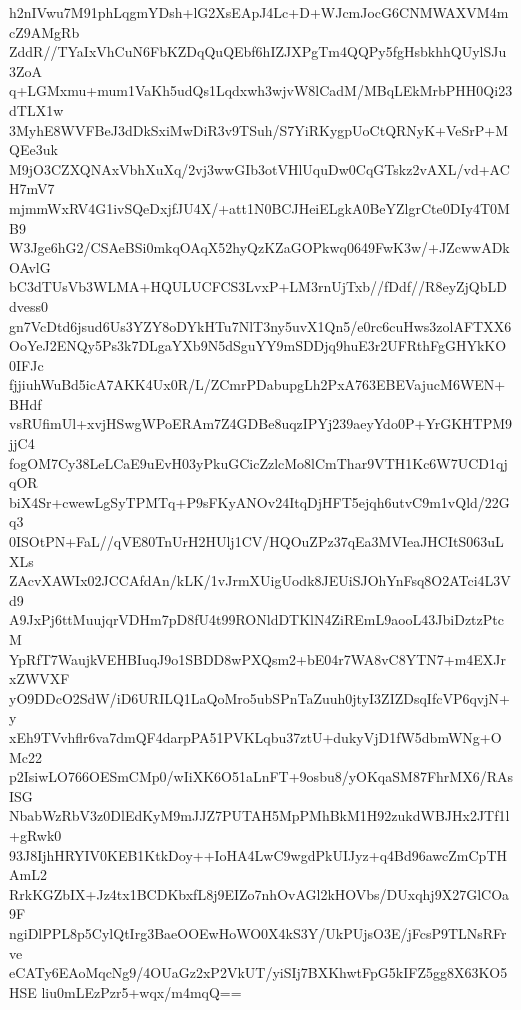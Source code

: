 h2nIVwu7M91phLqgmYDsh+lG2XsEApJ4Lc+D+WJcmJocG6CNMWAXVM4mcZ9AMgRb
ZddR//TYaIxVhCuN6FbKZDqQuQEbf6hIZJXPgTm4QQPy5fgHsbkhhQUylSJu3ZoA
q+LGMxmu+mum1VaKh5udQs1Lqdxwh3wjvW8lCadM/MBqLEkMrbPHH0Qi23dTLX1w
3MyhE8WVFBeJ3dDkSxiMwDiR3v9TSuh/S7YiRKygpUoCtQRNyK+VeSrP+MQEe3uk
M9jO3CZXQNAxVbhXuXq/2vj3wwGIb3otVHlUquDw0CqGTskz2vAXL/vd+ACH7mV7
mjmmWxRV4G1ivSQeDxjfJU4X/+att1N0BCJHeiELgkA0BeYZlgrCte0DIy4T0MB9
W3Jge6hG2/CSAeBSi0mkqOAqX52hyQzKZaGOPkwq0649FwK3w/+JZcwwADkOAvlG
bC3dTUsVb3WLMA+HQULUCFCS3LvxP+LM3rnUjTxb//fDdf//R8eyZjQbLDdvess0
gn7VcDtd6jsud6Us3YZY8oDYkHTu7NlT3ny5uvX1Qn5/e0rc6cuHws3zolAFTXX6
OoYeJ2ENQy5Ps3k7DLgaYXb9N5dSguYY9mSDDjq9huE3r2UFRthFgGHYkKO0IFJc
fjjiuhWuBd5icA7AKK4Ux0R/L/ZCmrPDabupgLh2PxA763EBEVajucM6WEN+BHdf
vsRUfimUl+xvjHSwgWPoERAm7Z4GDBe8uqzIPYj239aeyYdo0P+YrGKHTPM9jjC4
fogOM7Cy38LeLCaE9uEvH03yPkuGCicZzlcMo8lCmThar9VTH1Kc6W7UCD1qjqOR
biX4Sr+cwewLgSyTPMTq+P9sFKyANOv24ItqDjHFT5ejqh6utvC9m1vQld/22Gq3
0ISOtPN+FaL//qVE80TnUrH2HUlj1CV/HQOuZPz37qEa3MVIeaJHCItS063uLXLs
ZAcvXAWIx02JCCAfdAn/kLK/1vJrmXUigUodk8JEUiSJOhYnFsq8O2ATci4L3Vd9
A9JxPj6ttMuujqrVDHm7pD8fU4t99RONldDTKlN4ZiREmL9aooL43JbiDztzPtcM
YpRfT7WaujkVEHBIuqJ9o1SBDD8wPXQsm2+bE04r7WA8vC8YTN7+m4EXJrxZWVXF
yO9DDcO2SdW/iD6URILQ1LaQoMro5ubSPnTaZuuh0jtyI3ZIZDsqIfcVP6qvjN+y
xEh9TVvhflr6va7dmQF4darpPA51PVKLqbu37ztU+dukyVjD1fW5dbmWNg+OMc22
p2IsiwLO766OESmCMp0/wIiXK6O51aLnFT+9osbu8/yOKqaSM87FhrMX6/RAsISG
NbabWzRbV3z0DlEdKyM9mJJZ7PUTAH5MpPMhBkM1H92zukdWBJHx2JTf1l+gRwk0
93J8IjhHRYIV0KEB1KtkDoy++IoHA4LwC9wgdPkUIJyz+q4Bd96awcZmCpTHAmL2
RrkKGZbIX+Jz4tx1BCDKbxfL8j9EIZo7nhOvAGl2kHOVbs/DUxqhj9X27GlCOa9F
ngiDlPPL8p5CylQtIrg3BaeOOEwHoWO0X4kS3Y/UkPUjsO3E/jFcsP9TLNsRFrve
eCATy6EAoMqcNg9/4OUaGz2xP2VkUT/yiSIj7BXKhwtFpG5kIFZ5gg8X63KO5HSE
liu0mLEzPzr5+wqx/m4mqQ==
